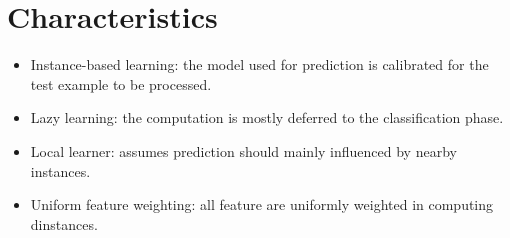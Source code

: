 \section{Characteristics}

	\begin{multicols}{2}
		\begin{itemize}
			\item Instance-based learning: the model used for prediction is calibrated for the test example to be processed.
			\item Lazy learning: the computation is mostly deferred to the classification phase.
			\item Local learner: assumes prediction should mainly influenced by nearby instances.
			\item Uniform feature weighting: all feature are uniformly weighted in computing dinstances.
		\end{itemize}
	\end{multicols}

